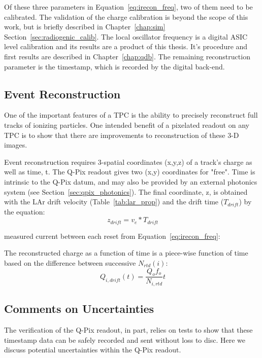 Of these three parameters in Equation~\ref{eq:irecon_freq}, two of them need to be calibrated.
The validation of the charge calibration is beyond the scope of this work, but is briefly described in Chapter~\ref{chap:sim} Section~\ref{sec:radiogenic_calib}.
The local oscillator frequency is a digital ASIC level calibration and its results are a product of this thesis.
It's procedure and first results are described in Chapter~\ref{chap:qdb}.
The remaining reconstruction parameter is the timestamp, which is recorded by the digital back-end.


\subsection{Event Reconstruction}

One of the important features of a TPC is the ability to precisely reconstruct full tracks of ionizing particles.
One intended benefit of a pixelated readout on any TPC is to show that there are improvements to reconstruction of these 3-D images.

Event reconstruction requires 3-spatial coordinates (x,y,z) of a track's charge as well as time, t. 
The Q-Pix readout gives two (x,y) coordinates for "free".
Time is intrinsic to the Q-Pix datum, and may also be provided by an external photonics system (see Section~\ref{sec:qpix_photonics}).
The final coordinate, z, is obtained with the LAr drift velocity (Table~\ref{tab:lar_prop}) and the drift time ($T_{drift}$) by the equation:
\begin{equation}~\label{eq:driftDistance}
  z_{drift} = v_{e} * T_{drift}
\end{equation}


measured current between each reset from Equation~\ref{eq:irecon_freq}:

The reconstructed charge as a function of time is a piece-wise function of time based on the difference between successive $N_{rtd}(i)$:
\begin{equation}~\label{eq:piece_wise}
  Q_{i,drift}(t) = \frac{Q_{o}f_{o}}{N_{i,rtd}}t
\end{equation}


\subsection{Comments on Uncertainties}

The verification of the Q-Pix readout, in part, relies on tests to show that these timestamp data can be safely recorded and sent without loss to disc.
Here we discuss potential uncertainties within the Q-Pix readout.

